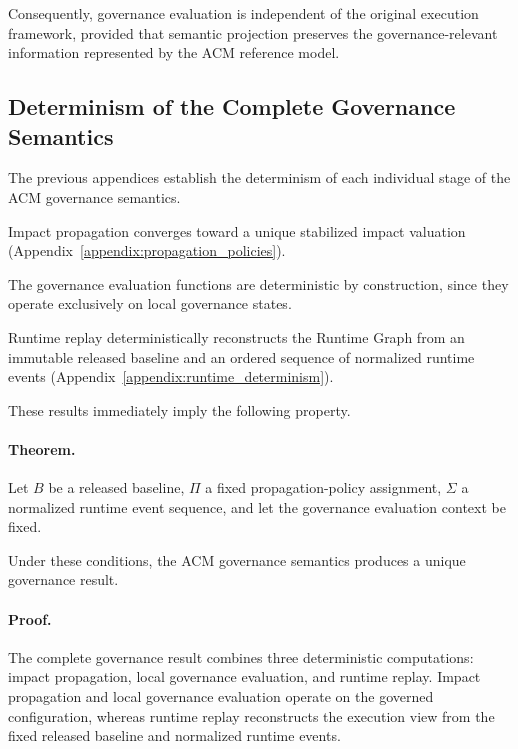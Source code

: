 \documentclass[10pt]{article}
\begin{document}
Consequently, governance evaluation is independent of the original execution framework, provided that semantic projection preserves the governance-relevant information represented by the ACM reference model.

\subsection{Determinism of the Complete Governance Semantics}
\label{appendix:global_determinism}

The previous appendices establish the determinism of each individual stage of the ACM governance semantics.

Impact propagation converges toward a unique stabilized impact valuation (Appendix~\ref{appendix:propagation_policies}).

The governance evaluation functions are deterministic by construction, since they operate exclusively on local governance states.

Runtime replay deterministically reconstructs the Runtime Graph from an immutable released baseline and an ordered sequence of normalized runtime events
(Appendix~\ref{appendix:runtime_determinism}).

These results immediately imply the following property.

\paragraph*{Theorem.}

Let $B$ be a released baseline, $\Pi$ a fixed propagation-policy assignment,
$\Sigma$ a normalized runtime event sequence, and let the governance evaluation
context be fixed.

Under these conditions, the ACM governance semantics produces a unique
governance result.

\paragraph*{Proof.}

The complete governance result combines three deterministic computations:
impact propagation, local governance evaluation, and runtime replay. Impact
propagation and local governance evaluation operate on the governed
configuration, whereas runtime replay reconstructs the execution view from the
fixed released baseline and normalized runtime events.
\end{document}
